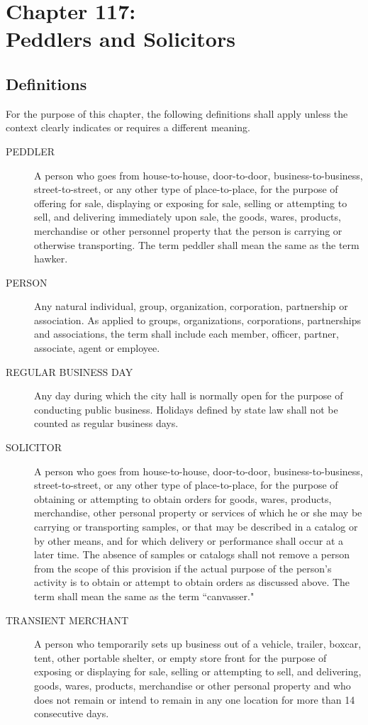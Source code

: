 \chapter*{Chapter 117: \\
	Peddlers and Solicitors}
    \minitoc
    \pagebreak

\section{Definitions}
For the purpose of this chapter, the following definitions shall apply unless the context clearly indicates or requires a different meaning.
\begin{description}
    \item[PEDDLER] A person who goes from house-to-house, door-to-door, business-to-business, street-to-street, or any other type of place-to-place, for the purpose of offering for sale, displaying or exposing for sale, selling or attempting to sell, and delivering immediately upon sale, the goods, wares, products, merchandise or other personnel property that the person is carrying or otherwise transporting. The term peddler shall mean the same as the term hawker.
    \item[PERSON] Any natural individual, group, organization, corporation, partnership or association. As applied to groups, organizations, corporations, partnerships and associations, the term shall include each member, officer, partner, associate, agent or employee.
    \item[REGULAR BUSINESS DAY] Any day during which the city hall is normally open for the purpose of conducting public business. Holidays defined by state law shall not be counted as regular business days.
    \item[SOLICITOR] A person who goes from house-to-house, door-to-door, business-to-business, street-to-street, or any other type of place-to-place, for the purpose of obtaining or attempting to obtain orders for goods, wares, products, merchandise, other personal property or services of which he or she may be carrying or transporting samples, or that may be described in a catalog or by other means, and for which delivery or performance shall occur at a later time. The absence of samples or catalogs shall not remove a person from the scope of this provision if the actual purpose of the person's activity is to obtain or attempt to obtain orders as discussed above. The term shall mean the same as the term “canvasser."
    \item[TRANSIENT MERCHANT] A person who temporarily sets up business out of a vehicle, trailer, boxcar, tent, other portable shelter, or empty store front for the purpose of exposing or displaying for sale, selling or attempting to sell, and delivering, goods, wares, products, merchandise or other personal property and who does not remain or intend to remain in any one location for more than 14 consecutive days.
\end{description}

